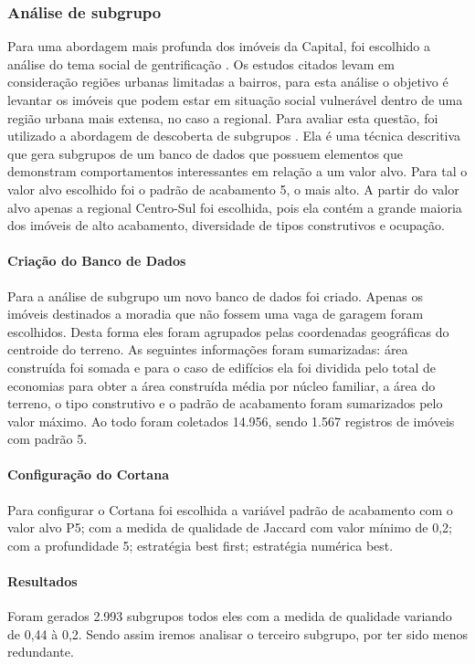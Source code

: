 \documentclass[12pt]{article}
\begin{document}
\subsubsection{Análise de subgrupo}
Para uma abordagem mais profunda dos imóveis da Capital, foi escolhido a análise do tema social de gentrificação \cite{dos2019sapucai, solla2019resistencia, andrade2020urban}. Os estudos citados levam em consideração regiões urbanas limitadas a bairros, para esta análise o objetivo é levantar os imóveis que podem estar em situação social vulnerável dentro de uma região urbana mais extensa, no caso a regional. Para avaliar esta questão, foi utilizado a abordagem de descoberta de subgrupos \cite{atzmueller2015subgroup}. Ela é uma técnica descritiva que gera subgrupos de um banco de dados que possuem elementos que demonstram comportamentos interessantes em relação a um valor alvo. Para tal o valor alvo escolhido foi o padrão de acabamento 5, o mais alto. A partir do valor alvo apenas a regional Centro-Sul foi escolhida, pois ela contém a grande maioria dos imóveis de alto acabamento, diversidade de tipos construtivos e ocupação.

\paragraph{Criação do Banco de Dados}
Para a análise de subgrupo um novo banco de dados foi criado. Apenas os imóveis destinados a moradia que não fossem uma vaga de garagem foram escolhidos. Desta forma eles foram agrupados pelas coordenadas geográficas do centroide do terreno. As seguintes informações foram sumarizadas: área construída foi somada e para o caso de edifícios ela foi dividida pelo total de economias para obter a área construída média por núcleo familiar, a área do terreno, o tipo construtivo e o padrão de acabamento foram sumarizados pelo valor máximo. Ao todo foram coletados 14.956, sendo 1.567 registros de imóveis com padrão 5.

\paragraph{Configuração do Cortana}
Para configurar o Cortana foi escolhida a variável padrão de acabamento com o valor alvo P5; com a medida de qualidade de Jaccard com valor mínimo de 0,2; com a profundidade 5; estratégia best first; estratégia numérica best.

\paragraph{Resultados}
Foram gerados 2.993 subgrupos todos eles com a medida de qualidade variando de 0,44 à 0,2. Sendo assim iremos analisar o terceiro subgrupo, por ter sido menos redundante.
\end{document}
